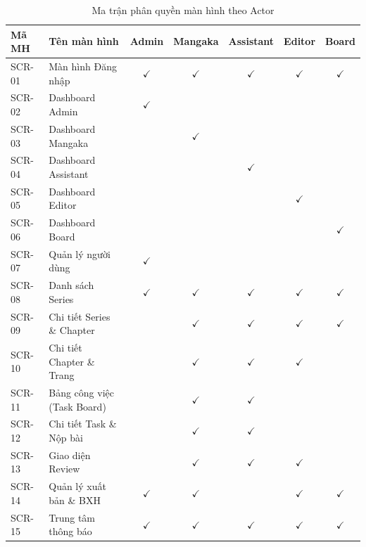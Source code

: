 \begin{table}[H]
\centering
\renewcommand{\arraystretch}{1.3}
\begin{tabularx}{\textwidth}{|l|>{\raggedright\arraybackslash}X|c|c|c|c|c|}
\hline
\rowcolor{tableheader}
\textbf{Mã MH} & \textbf{Tên màn hình} & \textbf{Admin} & \textbf{Mangaka} & \textbf{Assistant} & \textbf{Editor} & \textbf{Board} \\ \hline
SCR-01 & Màn hình Đăng nhập & $\checkmark$ & $\checkmark$ & $\checkmark$ & $\checkmark$ & $\checkmark$ \\ \hline
SCR-02 & Dashboard Admin & $\checkmark$ & & & & \\ \hline
SCR-03 & Dashboard Mangaka & & $\checkmark$ & & & \\ \hline
SCR-04 & Dashboard Assistant & & & $\checkmark$ & & \\ \hline
SCR-05 & Dashboard Editor & & & & $\checkmark$ & \\ \hline
SCR-06 & Dashboard Board & & & & & $\checkmark$ \\ \hline
SCR-07 & Quản lý người dùng & $\checkmark$ & & & & \\ \hline
SCR-08 & Danh sách Series & $\checkmark$ & $\checkmark$ & $\checkmark$ & $\checkmark$ & $\checkmark$ \\ \hline
SCR-09 & Chi tiết Series \& Chapter & & $\checkmark$ & $\checkmark$ & $\checkmark$ & $\checkmark$ \\ \hline
SCR-10 & Chi tiết Chapter \& Trang & & $\checkmark$ & $\checkmark$ & $\checkmark$ & \\ \hline
SCR-11 & Bảng công việc (Task Board) & & $\checkmark$ & $\checkmark$ & & \\ \hline
SCR-12 & Chi tiết Task \& Nộp bài & & $\checkmark$ & $\checkmark$ & & \\ \hline
SCR-13 & Giao diện Review & & $\checkmark$ & $\checkmark$ & $\checkmark$ & \\ \hline
SCR-14 & Quản lý xuất bản \& BXH & $\checkmark$ & $\checkmark$ & & $\checkmark$ & $\checkmark$ \\ \hline
SCR-15 & Trung tâm thông báo & $\checkmark$ & $\checkmark$ & $\checkmark$ & $\checkmark$ & $\checkmark$ \\ \hline
\end{tabularx}
\caption{Ma trận phân quyền màn hình theo Actor}
\label{tab:screen_authorization}
\end{table}

